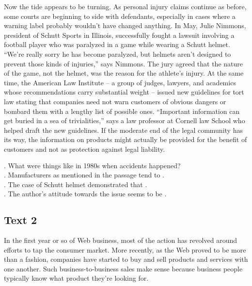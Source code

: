 Now the tide appears to be turning. As personal injury claims continue as before, some courts are beginning to side with defendants, especially in cases where a warning label probably wouldn’t have changed anything. In May, Julie Nimmons, president of Schutt Sports in Illinois, successfully fought a lawsuit involving a football player who was paralyzed in a game while wearing a Schutt helmet. “We’re really sorry he has become paralyzed, but helmets aren’t designed to prevent those kinds of injuries,” says Nimmons. The jury agreed that the nature of the game, not the helmet, was the reason for the athlete’s injury. At the same time, the American Law Institute -- a group of judges, lawyers, and academics whose recommendations carry substantial weight -- issued new guidelines for tort law stating that companies need not warn customers of obvious dangers or bombard them with a lengthy list of possible ones. “Important information can get buried in a sea of trivialities,” says a law professor at Cornell law School who helped draft the new guidelines. If the moderate end of the legal community has its way, the information on products might actually be provided for the benefit of customers and not as protection against legal liability.
\begin{questions}  .	What were things like in 1980s when accidents happened? \\
  .	Manufacturers as mentioned in the passage tend to \ltk{}.\\
  .	The case of Schutt helmet demonstrated that \ltk{}.\\
  .	The author’s attitude towards the issue seems to be \ltk{}.\\
\end{questions}    \subsection{Text 2}
In the first year or so of Web business, most of the action has revolved around efforts to tap the consumer market. More recently, as the Web proved to be more than a fashion, companies have started to buy and sell products and services with one another. Such business-to-business sales make sense because business people typically know what product they’re looking for.

